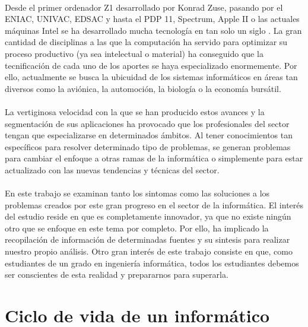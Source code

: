 \documentclass[12pt, a4paper]{report}
\begin{document}
        \paragraph{}
        Desde el primer ordenador Z1 desarrollado por Konrad Zuse, pasando por el ENIAC, UNIVAC, EDSAC y hasta el PDP 11, Spectrum, Apple II o las actuales máquinas Intel se ha desarrollado mucha tecnología en tan solo un siglo \cite{um:historia-infor}. La gran cantidad de disciplinas a las que la computación ha servido para optimizar su proceso productivo (ya sea intelectual o material) ha conseguido que la tecnificación de cada uno de los aportes se haya especializado enormemente. Por ello, actualmente se busca la ubicuidad de los sistemas informáticos en áreas tan diversos como la aviónica, la automoción, la biología o la economía bursátil.
        
        \paragraph{}
        La vertiginosa velocidad con la que se han producido estos avances y la segmentación de sus aplicaciones ha provocado que los profesionales del sector tengan que especializarse en determinados ámbitos. Al tener conocimientos tan específicos para resolver determinado tipo de problemas, se generan problemas para cambiar el enfoque a otras ramas de la informática o simplemente para estar actualizado con las nuevas tendencias y técnicas del sector.
        
        \paragraph{}
        En este trabajo se examinan tanto los sintomas como las soluciones a los problemas creados por este gran progreso en el sector de la informática. El interés del estudio reside en que es completamente innovador, ya que no existe ningún otro que se enfoque en este tema por completo. Por ello, ha implicado la recopilación de información de determinadas fuentes y su sintesis para realizar nuestro propio análisis. Otro gran interés de este trabajo consiste en que, como estudiantes de un grado en ingeniería informática, todos los estudiantes debemos ser conscientes de esta realidad y prepararnos para superarla.
    
    \section{Ciclo de vida de un informático}
\end{document}
